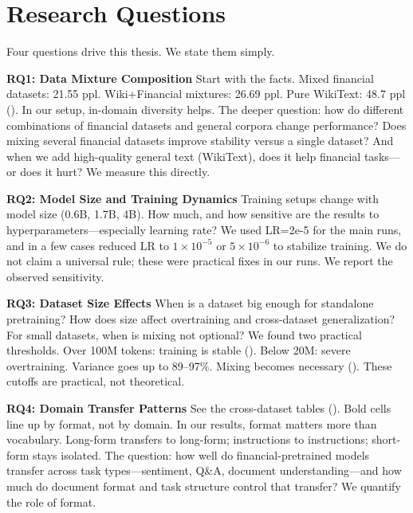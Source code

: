 \section{Research Questions}

Four questions drive this thesis. We state them simply.

\textbf{RQ1: Data Mixture Composition}
Start with the facts. Mixed financial datasets: 21.55 ppl. Wiki+Financial mixtures: 26.69 ppl. Pure WikiText: 48.7 ppl (). In our setup, in-domain diversity helps. The deeper question: how do different combinations of financial datasets and general corpora change performance? Does mixing several financial datasets improve stability versus a single dataset? And when we add high-quality general text (WikiText), does it help financial tasks—or does it hurt? We measure this directly.

\textbf{RQ2: Model Size and Training Dynamics}
Training setups change with model size (0.6B, 1.7B, 4B). How much, and how sensitive are the results to hyperparameters—especially learning rate? We used LR=2e-5 for the main runs, and in a few cases reduced LR to $1\times10^{-5}$ or $5\times10^{-6}$ to stabilize training. We do not claim a universal rule; these were practical fixes in our runs. We report the observed sensitivity.

\textbf{RQ3: Dataset Size Effects}
When is a dataset big enough for standalone pretraining? How does size affect overtraining and cross-dataset generalization? For small datasets, when is mixing not optional? We found two practical thresholds. Over 100M tokens: training is stable (). Below 20M: severe overtraining. Variance goes up to 89--97\%. Mixing becomes necessary (). These cutoffs are practical, not theoretical.

\textbf{RQ4: Domain Transfer Patterns}
See the cross-dataset tables (). Bold cells line up by format, not by domain. In our results, format matters more than vocabulary. Long-form transfers to long-form; instructions to instructions; short-form stays isolated. The question: how well do financial-pretrained models transfer across task types—sentiment, Q\&A, document understanding—and how much do document format and task structure control that transfer? We quantify the role of format.

